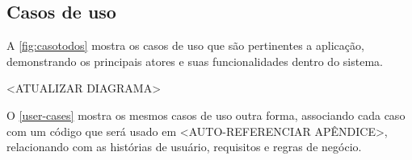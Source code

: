 \subsection{Casos de uso}

A \autoref{fig:casotodos} mostra os casos de uso que são pertinentes a aplicação, demonstrando os principais atores e suas funcionalidades dentro do sistema.

\begin{center} <ATUALIZAR DIAGRAMA> \end{center}

O \autoref{user-cases} mostra os mesmos casos de uso outra forma, associando cada caso com um código que será usado em <AUTO-REFERENCIAR APÊNDICE>, relacionando com as histórias de usuário, requisitos e regras de negócio.

